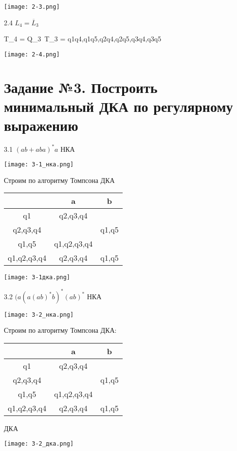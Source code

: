 \documentclass{article}
\begin{document}
\texttt{[image: 2-3.png]}
\newpage

2.4 \(L_4 = \overline L_3 \)

T_4 = Q_3\ T_3 = q1q4,q1q5,q2q4,q2q5,q3q4,q3q5

\texttt{[image: 2-4.png]}

\newpage
\section
{Задание №3. Построить минимальный ДКА по регулярному выражению}

3.1 \((ab + aba)^* a \)
\newline
НКА

\texttt{[image: 3-1\_нка.png]}

Строим по алгоритму Томпсона ДКА

\begin{tabular}{ | c | c | c | }
\hline
& a & b \\ \hline
q1 & q2,q3,q4 & \\ \hline
q2,q3,q4 & & q1,q5 \\ \hline
q1,q5 & q1,q2,q3,q4 & \\ \hline
q1,q2,q3,q4 & q2,q3,q4 & q1,q5 \\
\hline
\end{tabular}

\texttt{[image: 3-1дка.png]}

\newpage

3.2 \((a(a(ab)^*b)^*(ab)^* \)
\newline
НКА

\texttt{[image: 3-2\_нка.png]}

Строим по алгоритму Томпсона ДКА:

\begin{tabular}{ | c | c | c | }
\hline
& a & b \\ \hline
q1 & q2,q3,q4 & \\ \hline
q2,q3,q4 & & q1,q5 \\ \hline
q1,q5 & q1,q2,q3,q4 & \\ \hline
q1,q2,q3,q4 & q2,q3,q4 & q1,q5 \\ \hline
\end{tabular}

\newline

ДКА

\texttt{[image: 3-2\_дка.png]}
\end{document}
